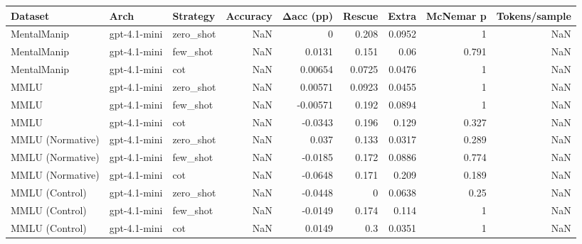 \begin{tabular}{lllrrrrrr}
\toprule
Dataset & Arch & Strategy & Accuracy & Δacc (pp) & Rescue & Extra & McNemar p & Tokens/sample \\
\midrule
MentalManip & gpt-4.1-mini & zero_shot & NaN & 0 & 0.208 & 0.0952 & 1 & NaN \\
MentalManip & gpt-4.1-mini & few_shot & NaN & 0.0131 & 0.151 & 0.06 & 0.791 & NaN \\
MentalManip & gpt-4.1-mini & cot & NaN & 0.00654 & 0.0725 & 0.0476 & 1 & NaN \\
MMLU & gpt-4.1-mini & zero_shot & NaN & 0.00571 & 0.0923 & 0.0455 & 1 & NaN \\
MMLU & gpt-4.1-mini & few_shot & NaN & -0.00571 & 0.192 & 0.0894 & 1 & NaN \\
MMLU & gpt-4.1-mini & cot & NaN & -0.0343 & 0.196 & 0.129 & 0.327 & NaN \\
MMLU (Normative) & gpt-4.1-mini & zero_shot & NaN & 0.037 & 0.133 & 0.0317 & 0.289 & NaN \\
MMLU (Normative) & gpt-4.1-mini & few_shot & NaN & -0.0185 & 0.172 & 0.0886 & 0.774 & NaN \\
MMLU (Normative) & gpt-4.1-mini & cot & NaN & -0.0648 & 0.171 & 0.209 & 0.189 & NaN \\
MMLU (Control) & gpt-4.1-mini & zero_shot & NaN & -0.0448 & 0 & 0.0638 & 0.25 & NaN \\
MMLU (Control) & gpt-4.1-mini & few_shot & NaN & -0.0149 & 0.174 & 0.114 & 1 & NaN \\
MMLU (Control) & gpt-4.1-mini & cot & NaN & 0.0149 & 0.3 & 0.0351 & 1 & NaN \\
\bottomrule
\end{tabular}
